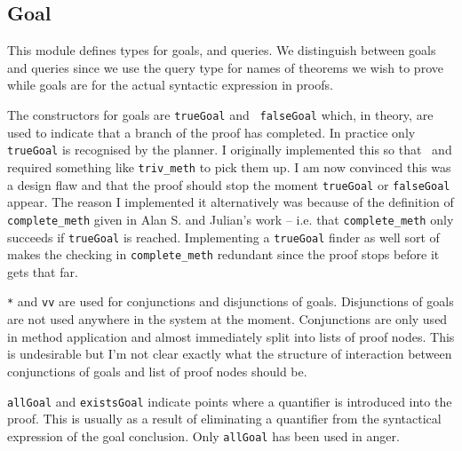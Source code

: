 \subsection{Goal}
This module defines types for goals,
and queries.  We distinguish between goals and
queries since we use the query type for names of theorems we wish to
prove while goals are for the actual syntactic expression in proofs.

The constructors for goals are {\tt trueGoal} and {\tt
  falseGoal} which, in theory, are used to indicate
that a branch of the proof has completed.  In practice only {\tt
  trueGoal} is recognised by the planner.  I originally implemented
this so that \lclam\ and required
something like {\tt triv\_meth} to pick them up.  I
am now convinced this was a design flaw and that the proof should stop 
the moment {\tt trueGoal} or {\tt falseGoal} appear.  The reason I
implemented it alternatively was because of the definition of {\tt
  complete\_meth} given in Alan S. and Julian's
work -- i.e. that {\tt complete\_meth} only succeeds if {\tt trueGoal} 
is reached.  Implementing a {\tt trueGoal} finder as well sort of
makes the checking in {\tt complete\_meth} redundant since the proof
stops before it gets that far.

{\tt **}\index{**} and {\tt vv} are used for conjunctions and 
disjunctions of goals.  Disjunctions of goals are not used anywhere in 
the system at the moment.  Conjunctions are only used in method
application and almost immediately split into lists of proof nodes.
This is undesirable but I'm not clear exactly what the structure of
interaction between conjunctions of goals and list of proof nodes
should be.

{\tt allGoal} and {\tt existsGoal}
indicate points where a quantifier is introduced into the proof.  This 
is usually as a result of eliminating a quantifier from the
syntactical expression of the goal conclusion.  Only {\tt allGoal} has 
been used in anger.

